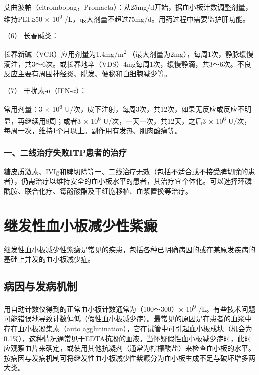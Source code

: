 艾曲波帕（eltrombopag，Promacta）：从25mg/d开始，据血小板计数调整剂量，维持PLT≥50
× 10\textsuperscript{9}
/L，最大剂量不超过75mg/d。用药过程中需要监护肝功能。

\hypertarget{text00331.htmlux5cux23CHP12-1-1-3-3-2-6}{}
（6） 长春碱类：

长春新碱（VCR）应用剂量为1.4mg/m\textsuperscript{2}
（最大剂量为2mg），每周1次，静脉缓慢滴注，共3～6次。或长春地辛（VDS）4mg每周1次，缓慢静滴，共3～6次。不良反应主要有周围神经炎、脱发、便秘和白细胞减少等。

\hypertarget{text00331.htmlux5cux23CHP12-1-1-3-3-2-7}{}
（7） 干扰素-α（IFN-α）：

常用剂量：3 × 10\textsuperscript{6}
U/次，皮下注射，每周3次，共12次，如果无反应或反应不明显，再继续用8周；或者3
× 10\textsuperscript{6} U/次，一天一次，共12天，之后3 ×
10\textsuperscript{6}
U/次，每周一次，维持1个月以上。副作用有发热、肌肉酸痛等。

\subsubsection{一、二线治疗失败ITP患者的治疗}

糖皮质激素、IVIg和脾切除等一、二线治疗无效（包括不适合或不接受脾切除的患者），仍需治疗以维持安全的血小板水平的患者，其治疗宜个体化。可以选择环磷酰胺、联合化疗、霉酚酸酯及干细胞移植、血浆置换等治疗。

\protect\hypertarget{text00332.html}{}{}

\section{继发性血小板减少性紫癜}

继发性血小板减少性紫癜是常见的疾患，包括各种已明确病因的或在某原发疾病的基础上并发的血小板减少症。

\subsection{病因与发病机制}

用自动计数仪得到的正常血小板计数通常为（100～300）×
10\textsuperscript{9}
/L。有些技术问题可能错误地导致计数偏低（假性血小板减少症）。最常见的原因是在患者的血浆中存在血小板凝集素（auto
agglutination），它在试管中可引起血小板成块（机会为0.1\%），这种情况通常见于EDTA抗凝的血液。当怀疑假性血小板减少症时，此时应观察血片来确定，或使用其他抗凝剂（通常为柠檬酸盐）来检查血小板的水平。按病因与发病机制可将继发性血小板减少性紫癜分为血小板生成不足与破坏增多两大类。

